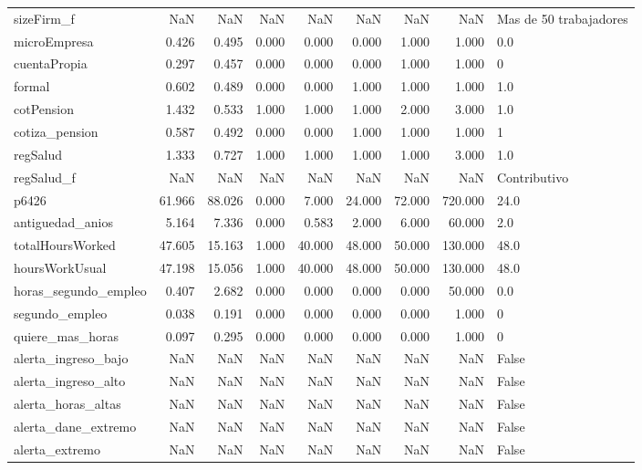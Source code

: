 \begin{longtable}{lrrrrrrrl}
sizeFirm\_f & NaN & NaN & NaN & NaN & NaN & NaN & NaN & Mas de 50 trabajadores \\
microEmpresa & 0.426 & 0.495 & 0.000 & 0.000 & 0.000 & 1.000 & 1.000 & 0.0 \\
cuentaPropia & 0.297 & 0.457 & 0.000 & 0.000 & 0.000 & 1.000 & 1.000 & 0 \\
formal & 0.602 & 0.489 & 0.000 & 0.000 & 1.000 & 1.000 & 1.000 & 1.0 \\
cotPension & 1.432 & 0.533 & 1.000 & 1.000 & 1.000 & 2.000 & 3.000 & 1.0 \\
cotiza\_pension & 0.587 & 0.492 & 0.000 & 0.000 & 1.000 & 1.000 & 1.000 & 1 \\
regSalud & 1.333 & 0.727 & 1.000 & 1.000 & 1.000 & 1.000 & 3.000 & 1.0 \\
regSalud\_f & NaN & NaN & NaN & NaN & NaN & NaN & NaN & Contributivo \\
p6426 & 61.966 & 88.026 & 0.000 & 7.000 & 24.000 & 72.000 & 720.000 & 24.0 \\
antiguedad\_anios & 5.164 & 7.336 & 0.000 & 0.583 & 2.000 & 6.000 & 60.000 & 2.0 \\
totalHoursWorked & 47.605 & 15.163 & 1.000 & 40.000 & 48.000 & 50.000 & 130.000 & 48.0 \\
hoursWorkUsual & 47.198 & 15.056 & 1.000 & 40.000 & 48.000 & 50.000 & 130.000 & 48.0 \\
horas\_segundo\_empleo & 0.407 & 2.682 & 0.000 & 0.000 & 0.000 & 0.000 & 50.000 & 0.0 \\
segundo\_empleo & 0.038 & 0.191 & 0.000 & 0.000 & 0.000 & 0.000 & 1.000 & 0 \\
quiere\_mas\_horas & 0.097 & 0.295 & 0.000 & 0.000 & 0.000 & 0.000 & 1.000 & 0 \\
alerta\_ingreso\_bajo & NaN & NaN & NaN & NaN & NaN & NaN & NaN & False \\
alerta\_ingreso\_alto & NaN & NaN & NaN & NaN & NaN & NaN & NaN & False \\
alerta\_horas\_altas & NaN & NaN & NaN & NaN & NaN & NaN & NaN & False \\
alerta\_dane\_extremo & NaN & NaN & NaN & NaN & NaN & NaN & NaN & False \\
alerta\_extremo & NaN & NaN & NaN & NaN & NaN & NaN & NaN & False \\
\end{longtable}
